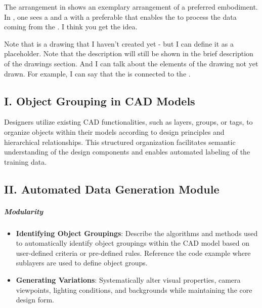 \patentParagraph
The arrangement in  shows an exemplary arrangement of a preferred embodiment. In , one sees a  and a  with a preferable  that enables the  to process the data coming from the . I think you get the idea.

\patentParagraph
Note that  is a drawing that I haven't created yet - but I can define it as a placeholder. Note that the description will still be shown in the brief description of the drawings section. And I can talk about the elements of the drawing not yet drawn. For example, I can say that the  is connected to the .

\subsection{I. Object Grouping in CAD Models}

Designers utilize existing CAD functionalities, such as layers, groups, or tags, to organize objects within their models according to design principles and hierarchical relationships. This structured organization facilitates semantic understanding of the design components and enables automated labeling of the training data.

\subsection{II. Automated Data Generation Module}

\subparagraph{Modularity}
\begin{itemize}
    \item \textbf{Identifying Object Groupings}: Describe the algorithms and methods used to automatically identify object groupings within the CAD model based on user-defined criteria or pre-defined rules. Reference the code example where sublayers are used to define object groups.
    \item \textbf{Generating Variations}: Systematically alter visual properties, camera viewpoints, lighting conditions, and backgrounds while maintaining the core design form.
\end{itemize}


